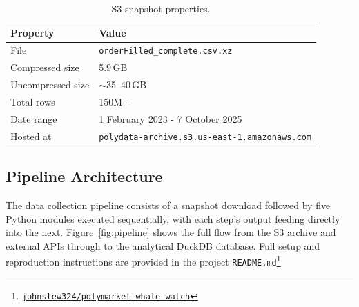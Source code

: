 \documentclass[11pt]{article}
\begin{document}
\vspace{0.6em}
\begin{table}[H]
\centering
\caption{S3 snapshot properties.}
\label{tab:s3_snapshot}
\small
\begin{tabularx}{\textwidth}{l X}
\toprule
\textbf{Property} & \textbf{Value} \\
\midrule
File                & \texttt{orderFilled\_complete.csv.xz} \\
Compressed size     & 5.9\,GB \\
Uncompressed size   & $\sim$35--40\,GB \\
Total rows          & 150M$+$ \\
Date range          & 1 February 2023 - 7 October 2025 \\
Hosted at           & \texttt{polydata-archive.s3.us-east-1.amazonaws.com} \\
\bottomrule
\end{tabularx}
\end{table}

\newpage
\subsection{Pipeline Architecture}
\label{sec:pipeline}

The data collection pipeline consists of a snapshot download followed
by five Python modules executed sequentially, with each step's output
feeding directly into the next.
Figure~\ref{fig:pipeline} shows the full flow from the S3 archive and
external APIs through to the analytical DuckDB database.
Full setup and reproduction instructions are provided in the project
\texttt{README.md}\footnote{\href{https://github.com/johnstew324/polymarket-whale-watch}{%
\faGithub\;\texttt{johnstew324/polymarket-whale-watch}}}
\end{document}
